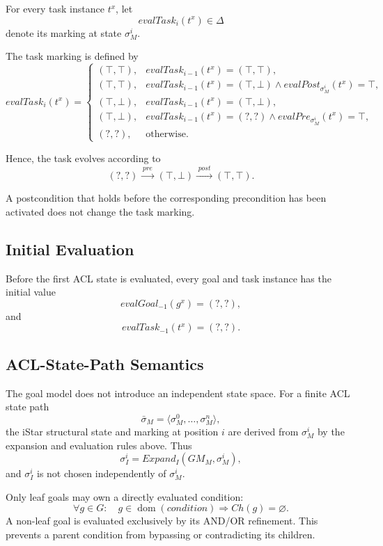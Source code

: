 \documentclass[11pt,a4paper]{article}
\newcommand{\Ch}{\mathit{Ch}}
\newcommand{\condition}{\mathit{condition}}
\begin{document}
For every task instance \(t^x\), let
\[
evalTask_i(t^x)\in\Delta
\]
denote its marking at state \(\sigma_M^i\).

The task marking is defined by
\[
evalTask_i(t^x)
=
\begin{cases}
(\top,\top),
&
evalTask_{i-1}(t^x)=(\top,\top),
\\[1mm]
(\top,\top),
&
evalTask_{i-1}(t^x)=(\top,\bot)
\land
evalPost_{\sigma_M^i}(t^x)=\top,
\\[1mm]
(\top,\bot),
&
evalTask_{i-1}(t^x)=(\top,\bot),
\\[1mm]
(\top,\bot),
&
evalTask_{i-1}(t^x)=(?,?)
\land
evalPre_{\sigma_M^i}(t^x)=\top,
\\[1mm]
(?,?),
&
\text{otherwise}.
\end{cases}
\]

Hence, the task evolves according to
\[
(?,?)
\xrightarrow{\;pre\;}
(\top,\bot)
\xrightarrow{\;post\;}
(\top,\top).
\]

A postcondition that holds before the corresponding precondition has
been activated does not change the task marking.


\subsection{Initial Evaluation}

Before the first ACL state is evaluated, every goal and task instance
has the initial value
\[
evalGoal_{-1}(g^x)=(?,?),
\]
and
\[
evalTask_{-1}(t^x)=(?,?).
\]

\subsection{ACL-State-Path Semantics}

The goal model does not introduce an independent state space.  For a finite
ACL state path
\[
\bar{\sigma}_M
=
\langle\sigma_M^0,\ldots,\sigma_M^n\rangle,
\]
the iStar structural state and marking at position $i$ are derived from
$\sigma_M^i$ by the expansion and evaluation rules above.  Thus
\[
\sigma_I^i
=
Expand_I(GM_M,\sigma_M^i),
\]
and $\sigma_I^i$ is not chosen independently of $\sigma_M^i$.

Only leaf goals may own a directly evaluated condition:
\[
\forall g\in G:
\quad
g\in\operatorname{dom}(\condition)
\Longrightarrow
\Ch(g)=\varnothing.
\tag{WF-GOAL-CONDITION}
\]
A non-leaf goal is evaluated exclusively by its AND/OR refinement.  This
prevents a parent condition from bypassing or contradicting its children.
\end{document}
